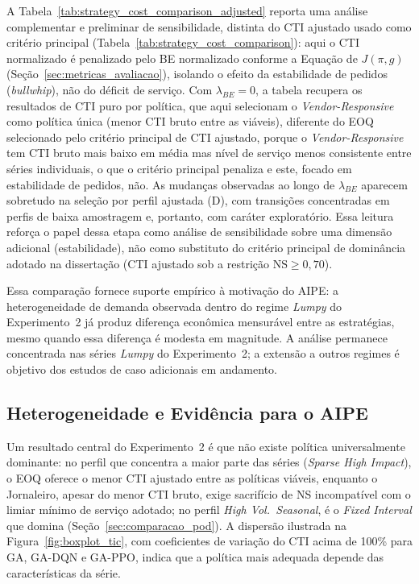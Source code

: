 A Tabela~\ref{tab:strategy_cost_comparison_adjusted} reporta uma análise complementar e preliminar de sensibilidade, distinta do CTI ajustado usado como critério principal (Tabela~\ref{tab:strategy_cost_comparison}): aqui o CTI normalizado é penalizado pelo BE normalizado conforme a Equação de $J(\pi,g)$ (Seção~\ref{sec:metricas_avaliacao}), isolando o efeito da estabilidade de pedidos (\textit{bullwhip}), não do déficit de serviço. Com $\lambda_{BE}=0$, a tabela recupera os resultados de CTI puro por política, que aqui selecionam o \textit{Vendor-Responsive} como política única (menor CTI bruto entre as viáveis), diferente do EOQ selecionado pelo critério principal de CTI ajustado, porque o \textit{Vendor-Responsive} tem CTI bruto mais baixo em média mas nível de serviço menos consistente entre séries individuais, o que o critério principal penaliza e este, focado em estabilidade de pedidos, não. As mudanças observadas ao longo de $\lambda_{BE}$ aparecem sobretudo na seleção por perfil ajustada (D), com transições concentradas em perfis de baixa amostragem e, portanto, com caráter exploratório. Essa leitura reforça o papel dessa etapa como análise de sensibilidade sobre uma dimensão adicional (estabilidade), não como substituto do critério principal de dominância adotado na dissertação (CTI ajustado sob a restrição $\mathrm{NS}\geq 0{,}70$).



Essa comparação fornece suporte empírico à motivação do AIPE: a heterogeneidade de demanda observada dentro do regime \textit{Lumpy} do Experimento~2 já produz diferença econômica mensurável entre as estratégias, mesmo quando essa diferença é modesta em magnitude. A análise permanece concentrada nas séries \textit{Lumpy} do Experimento~2; a extensão a outros regimes é objetivo dos estudos de caso adicionais em andamento.

\subsection{Heterogeneidade e Evidência para o AIPE}

Um resultado central do Experimento~2 é que não existe política universalmente dominante: no perfil que concentra a maior parte das séries (\textit{Sparse High Impact}), o EOQ oferece o menor CTI ajustado entre as políticas viáveis, enquanto o Jornaleiro, apesar do menor CTI bruto, exige sacrifício de NS incompatível com o limiar mínimo de serviço adotado; no perfil \textit{High Vol.~Seasonal}, é o \textit{Fixed Interval} que domina (Seção~\ref{sec:comparacao_pod}). A dispersão ilustrada na Figura~\ref{fig:boxplot_tic}, com coeficientes de variação do CTI acima de 100\% para GA, GA-DQN e GA-PPO, indica que a política mais adequada depende das características da série.

